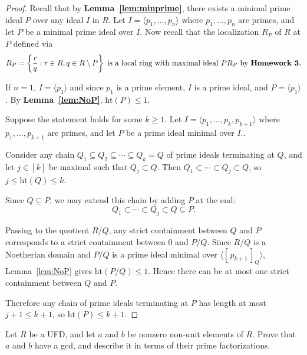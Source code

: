 \documentclass[addpoints,10pt]{exam}
\theoremstyle{plain}
\theoremstyle{definition}
\newtheorem{prob}[thm]{Problem}
\theoremstyle{plain}
\theoremstyle{plain}
\theoremstyle{definition}
\let\oldprob\prob
\let\endoldprob\endprob
\renewenvironment{prob}
  {\begin{singlespace}\oldprob}
  {\endoldprob\end{singlespace}}
\newcommand{\class}[2][]{\ensuremath{\left[\,#2\,\right]_{#1}}}
\begin{document}
\begin{proof}
Recall that by \textbf{Lemma~\ref{lem:minprime}}, there exists a minimal prime ideal $P$ over any ideal $I$ in $R$. Let $I=\langle p_{1},\hdots, p_{n}\rangle$ where $p_{1},\ldots,p_{n}$ are primes, and let $P$ be a minimal prime ideal over $I$. Now recall that the localization $R_{P}$ of $R$ at $P$ defined via
    $$R_{P}=\left\{\frac{r}{q}: r\in R, q\in R\setminus P\right\}\text{ is a local ring with maximal ideal }PR_{P}\text{ by \textbf{Homework 3}.}$$

If $n=1$, $I=\langle p_{1}\rangle$ and since $p_{1}$ is a prime element, $I$ is a prime ideal, and $P=\langle p_{1}\rangle$. By \textbf{Lemma~\ref{lem:NoP}}, $\mathrm{ht}(P)\leq 1$.

Suppose the statement holds for some $k\geq 1$. Let $I=\langle p_{1},\hdots,p_{k},p_{k+1}\rangle$ where $p_{1},\hdots,p_{k+1}$ are primes, and let $P$ be a prime ideal minimal over $I$..

Consider any chain $Q_{1}\subseteq Q_{2}\subseteq \cdots \subseteq Q_{k}=Q$ of prime ideals terminating at $Q$, and let $j\in [k]$ be maximal such that $Q_{j}\subset Q$. Then $Q_{1}\subset \cdots \subset Q_{j}\subset Q$, so $j\leq \mathrm{ht}(Q)\leq k$.

Since $Q\subseteq P$, we may extend this chain by adding $P$ at the end:
\[
Q_{1}\subset \cdots \subset Q_{j}\subset Q\subseteq P.
\]

Passing to the quotient $R/Q$, any strict containment between $Q$ and $P$
corresponds to a strict containment between $0$ and $P/Q$. Since $R/Q$ is a
Noetherian domain and $P/Q$ is a prime ideal minimal over
$\langle\class[Q]{p_{k+1}}\rangle$, Lemma~\ref{lem:NoP} gives
$\mathrm{ht}(P/Q)\le 1$. Hence there can be at most one strict containment
between $Q$ and $P$.

Therefore any chain of prime ideals terminating at $P$ has length at most
$j+1\le k+1$, so $\mathrm{ht}(P)\le k+1$.
\end{proof}

\newpage
\setcounter{thm}{0} %
\begin{prob}
Let $R$ be a UFD, and let $a$ and $b$ be nonzero non-unit elements of $R$.
Prove that $a$ and $b$ have a gcd, and describe it in terms of their prime factorizations.
\end{prob}
\end{document}
